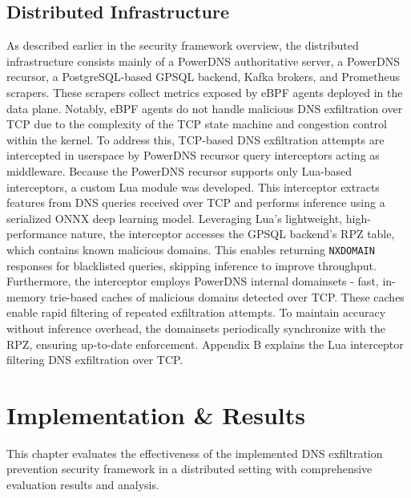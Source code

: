 \documentclass [11pt, proquest] {uwthesis}[2020/02/24]
\begin{document}
\section{Distributed Infrastructure }
As described earlier in the security framework overview, the distributed infrastructure consists mainly of a PowerDNS authoritative server, a PowerDNS recursor, a PostgreSQL-based GPSQL backend, Kafka brokers, and Prometheus scrapers. These scrapers collect metrics exposed by eBPF agents deployed in the data plane. Notably, eBPF agents do not handle malicious DNS exfiltration over TCP due to the complexity of the TCP state machine and congestion control within the kernel. To address this, TCP-based DNS exfiltration attempts are intercepted in userspace by PowerDNS recursor query interceptors acting as middleware. Because the PowerDNS recursor supports only Lua-based interceptors, a custom Lua module was developed. This interceptor extracts features from DNS queries received over TCP and performs inference using a serialized ONNX deep learning model. Leveraging Lua’s lightweight, high-performance nature, the interceptor accesses the GPSQL backend’s RPZ table, which contains known malicious domains. This enables returning \texttt{NXDOMAIN} responses for blacklisted queries, skipping inference to improve throughput.
Furthermore, the interceptor employs PowerDNS internal domainsets - fast, in-memory trie-based caches of malicious domains detected over TCP. These caches enable rapid filtering of repeated exfiltration attempts. To maintain accuracy without inference overhead, the domainsets periodically synchronize with the RPZ, ensuring up-to-date enforcement. Appendix B explains the Lua interceptor filtering DNS exfiltration over TCP.








\chapter{Implementation \& Results}
This chapter evaluates the effectiveness of the implemented DNS exfiltration prevention security framework in a distributed setting with comprehensive evaluation results and analysis.
\end{document}
